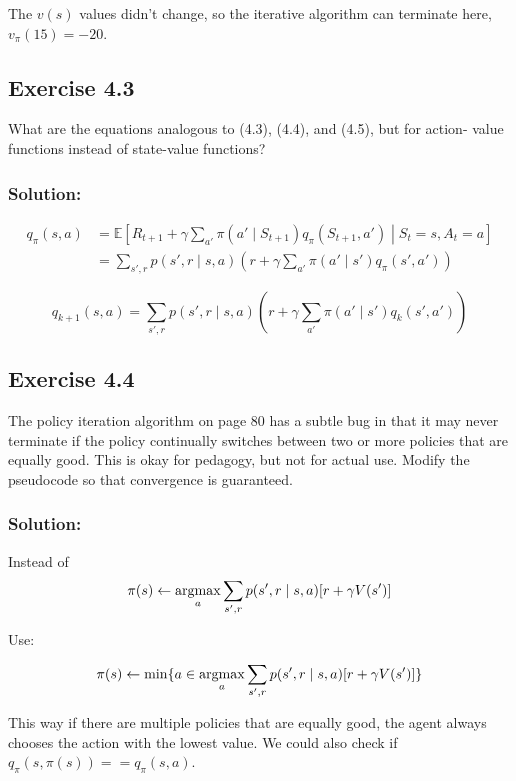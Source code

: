The $v(s)$ values didn't change, so the iterative algorithm can terminate here, $v_\pi(15) = -20$.

\subsection*{Exercise 4.3}
What are the equations analogous to (4.3), (4.4), and (4.5), but for action-
value functions instead of state-value functions?

\subsubsection*{Solution:}

\begin{align*}
    q_\pi(s, a) &= \mathbb{E} \left[R_{t+1} + \gamma \sum_{a'} \pi(a' \mid S_{t+1}) q_\pi(S_{t+1}, a') \middle| S_t = s, A_t = a \right] \\
    &= \sum_{s',r} p(s', r \mid s, a) \left(r + \gamma \sum_{a'} \pi(a'\mid s') q_\pi(s', a') \right)
\end{align*}

\[
    q_{k+1}(s, a) = \sum_{s',r} p(s', r \mid s, a) \left(r + \gamma \sum_{a'} \pi(a' \mid s') q_{k}(s', a') \right) 
\]

\subsection*{Exercise 4.4}
The policy iteration algorithm on page 80 has a subtle bug in that it may
never terminate if the policy continually switches between two or more policies that are
equally good. This is okay for pedagogy, but not for actual use. Modify the pseudocode
so that convergence is guaranteed.

\subsubsection*{Solution:}

Instead of 
\[
    \pi(s) \leftarrow \operatorname*{argmax}_a \sum_{s',r} p(s',r \mid s,a)[r + \gamma V(s')]
\]

Use:

\[
    \pi(s) \leftarrow \min\{ a \in \operatorname*{argmax}_a \sum_{s',r} p(s',r \mid s,a)[r + \gamma V(s')] \}
\]

This way if there are multiple policies that are equally good, the agent always chooses the action with the lowest value. We could also check if $q_\pi(s,\pi(s)) == q_\pi(s,a)$.

